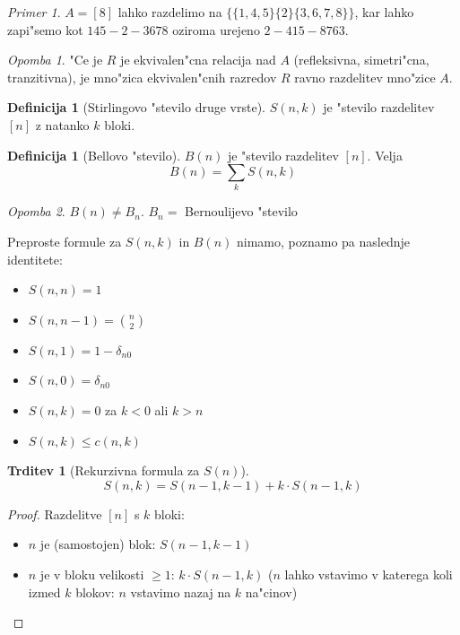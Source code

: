 \documentclass[a4paper,12pt]{article}
\theoremstyle{definition}
\newtheorem{defn}[counter]{Definicija}
\newtheorem{claim}[counter]{Trditev}
\theoremstyle{remark}
\newtheorem*{ex}{Primer}
\newtheorem*{rem}{Opomba}
\begin{document}
\begin{ex}
	$A = [8]$ lahko razdelimo na $\{ \{1, 4, 5\} \{2\} \{3, 6, 7, 8\}\}$, kar lahko zapi"semo kot $145-2-3678$ oziroma urejeno $2-415-8763$.
\end{ex}
\begin{rem}
	"Ce je $R$ je ekvivalen"cna relacija nad $A$ (refleksivna, simetri"cna, tranzitivna), je mno"zica ekvivalen"cnih razredov $R$ ravno razdelitev mno"zice $A$.
\end{rem}

\begin{defn}[Stirlingovo "stevilo druge vrste]
    $S(n,k)$ je "stevilo razdelitev $[n]$ z natanko $k$ bloki.
\end{defn}
\begin{defn}[Bellovo "stevilo]
	$B(n)$ je "stevilo razdelitev $[n]$. Velja
	\[B(n) = \sum_k S(n,k)\]
\end{defn}

\begin{rem}
	$B(n) \neq B_n$. $B_n =$ Bernoulijevo "stevilo
\end{rem}

Preproste formule za $S(n,k)$ in $B(n)$ nimamo, poznamo pa naslednje identitete:
\begin{itemize}
	\item $S(n,n) = 1$
	\item $S(n,n-1) = \binom{n}{2}$
	\item $S(n,1) = 1 - \delta_{n0}$
	\item $S(n,0) = \delta_{n0}$
	\item $S(n,k) = 0$ za $k < 0$ ali $k > n$
	\item $S(n,k) \leqslant c(n,k)$
\end{itemize}

\begin{claim}[Rekurzivna formula za $S(n)$]
    \[S(n, k) = S(n-1, k-1) + k \cdot S(n-1, k)\]
\end{claim}

\begin{proof}
    Razdelitve $[n]$ s $k$ bloki:
    \begin{itemize}
        \item $n$ je (samostojen) blok: $S(n-1, k-1)$
        \item $n$ je v bloku velikosti $\geq 1$: $k \cdot S(n-1, k)$ ($n$ lahko vstavimo v katerega koli izmed $k$ blokov: $n$ vstavimo nazaj na $k$ na"cinov)
    \end{itemize}
\end{proof}
\end{document}
